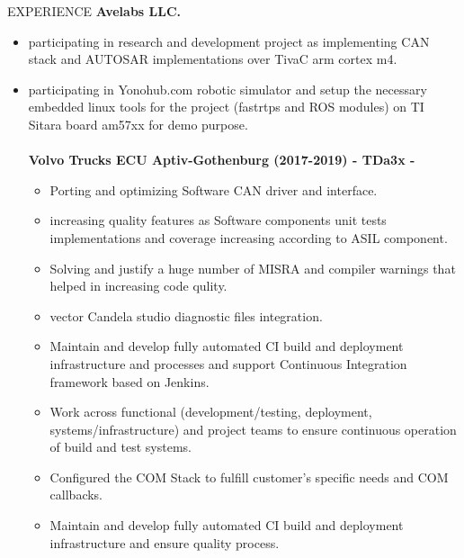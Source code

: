 \documentclass{resume} %
\begin{document}
\begin{rSection}{EXPERIENCE}
{\bf Avelabs LLC.}
\begin{itemize}
\setlength{\itemsep}{1pt}
  \setlength{\parskip}{0pt}
  \setlength{\parsep}{0pt}
    \item participating in research and development project as implementing CAN stack and AUTOSAR implementations over TivaC arm cortex m4.
     \item participating in Yonohub.com robotic simulator and setup the necessary embedded linux tools for the project (fastrtps and ROS modules) on TI Sitara board am57xx for demo purpose.
\\
\\{\bf Volvo Trucks ECU Aptiv-Gothenburg (2017-2019) - TDa3x - } 
\begin{itemize}
\setlength{\itemsep}{1pt}
  \setlength{\parskip}{0pt}
  \setlength{\parsep}{0pt}
    \item Porting and optimizing Software CAN driver and interface.
  \item increasing quality features as Software components unit tests implementations and coverage
increasing according to ASIL component.
\item Solving and justify a huge number of MISRA and compiler warnings that helped in increasing
code qulity.
\item vector Candela studio diagnostic files integration.
    \item Maintain and develop fully automated CI build and deployment infrastructure and processes and
support Continuous Integration framework based on Jenkins.
\item Work across functional (development/testing, deployment, systems/infrastructure) and project
teams to ensure continuous operation of build and test systems.
\item Configured the COM Stack to fulfill customer’s specific needs and COM callbacks.
    \item Maintain and develop fully automated CI build and deployment infrastructure and ensure quality process.
\end{itemize}
\\
\\


\end{itemize}
\end{rSection}
\end{document}
